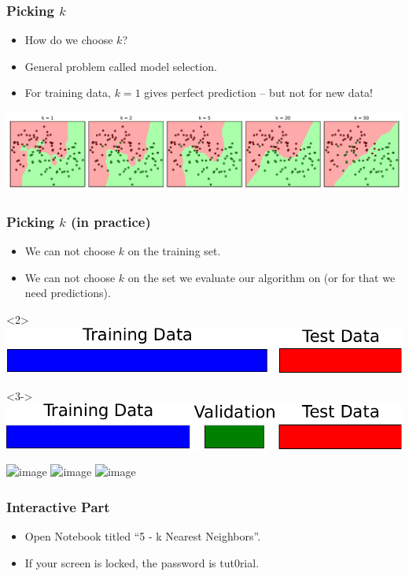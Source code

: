 \begin{frame}
    \frametitle{Picking $k$}
    \begin{itemize}
        \item How do we choose $k$?
        \item General problem called model selection.
        \item For training data, $k=1$ gives perfect prediction -- but not for new data!
    \end{itemize}
    \includegraphics[width=.98\linewidth]{knn-pics/two_moons_varying_k}
\end{frame}


\begin{frame}[t]
    \frametitle{Picking $k$ (in practice)}
    \begin{itemize}
        \item We can not choose $k$ on the training set.
        \item We can not choose $k$ on the set we evaluate our algorithm on (or
            for that we need predictions).
    \end{itemize}
    \center
        \begin{onlyenv}<2>
            \includegraphics[width=.7\linewidth]{knn-pics/train_test_bars-crop}\\
        \end{onlyenv}
        \begin{onlyenv}<3->
            \includegraphics[width=.7\linewidth]{knn-pics/train_val_test_bars-crop}\\
        \end{onlyenv}

    \includegraphics<4>[width=.7\linewidth]{knn-pics/two_moons_cross_validation_1}
    \includegraphics<5>[width=.7\linewidth]{knn-pics/two_moons_cross_validation_2}
    \includegraphics<6>[width=.7\linewidth]{knn-pics/two_moons_cross_validation_3}

\end{frame}

\begin{frame}
  \frametitle{Interactive Part}
  \begin{itemize}
      \item Open Notebook titled ``5 - k Nearest Neighbors''.
      \item If your screen is locked, the password is tut0rial.
  \end{itemize}
\end{frame}
